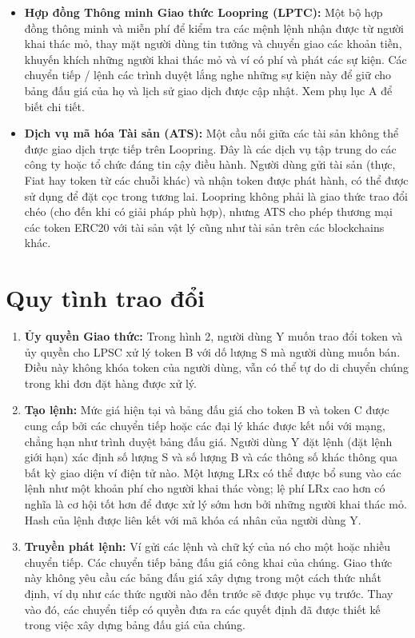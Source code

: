 \documentclass[12pt,a4paper]{article}
\begin{document}
\begin{multicols}{2}
\begin{itemize}
\item \textbf{Hợp đồng Thông minh Giao thức Loopring (LPTC): } Một bộ hợp đồng thông minh và miễn phí để kiểm tra các mệnh lệnh nhận được từ người khai thác mỏ, thay mặt người dùng tin tưởng và chuyển giao các khoản tiền, khuyến khích những người khai thác mỏ và ví có phí và phát các sự kiện. Các chuyển tiếp / lệnh các trình duyệt lắng nghe những sự kiện này để giữ cho bảng đấu giá của họ và lịch sử giao dịch được cập nhật. Xem phụ lục A để biết chi tiết.

\item \textbf{Dịch vụ mã hóa Tài sản (ATS):} Một cầu nối giữa các tài sản không thể được giao dịch trực tiếp trên Loopring. Đây là các dịch vụ tập trung do các công ty hoặc tổ chức đáng tin cậy điều hành. Người dùng gửi tài sản (thực, Fiat hay token từ các chuỗi khác) và nhận token được phát hành, có thể được sử dụng để đặt cọc trong tương lai. Loopring không phải là giao thức trao đổi chéo (cho đến khi có giải pháp phù hợp), nhưng ATS cho phép thương mại các token ERC20 với tài sản vật lý cũng như tài sản trên các blockchains khác.
\end{itemize}

\section{Quy tình trao đổi\label{sec:process}}

\begin{enumerate}[topsep=-5pt,itemsep=1ex,partopsep=5ex,parsep=1ex]
\item \textbf{Ủy quyền Giao thức: }Trong hình 2, người dùng Y muốn trao đổi token và ủy quyền cho LPSC xử lý token B với dố lượng S mà người dùng muốn bán. Điều này không khóa token của người dùng, vẫn có thể tự do di chuyển chúng trong khi đơn đặt hàng được xử lý.

\item \textbf{Tạo lệnh: }Mức giá hiện tại và bảng đấu giá cho token B và token C được cung cấp bởi các chuyển tiếp hoặc các đại lý khác được kết nối với mạng, chẳng hạn như trình duyệt bảng đấu giá. Người dùng Y đặt lệnh (đặt lệnh giới hạn) xác định số lượng S và số lượng B và các thông số khác thông qua bất kỳ giao diện ví điện tử nào. Một lượng LRx có thể được bổ sung vào các lệnh như một khoản phí cho người khai thác vòng; lệ phí LRx cao hơn có nghĩa là cơ hội tốt hơn để được xử lý sớm hơn bởi những người khai thác mỏ. Hash của lệnh được liên kết với mã khóa cá nhân của người dùng Y.

\item \textbf{Truyền phát lệnh: }Ví gửi các lệnh và chữ ký của nó cho một hoặc nhiều chuyển tiếp. Các chuyển tiếp bảng đấu giá công khai của chúng. Giao thức này không yêu cầu các bảng đấu giá xây dựng trong một cách thức nhất định, ví dụ như các thức người nào đến trước sẽ được phục vụ trước. Thay vào đó, các chuyển tiếp có quyền đưa ra các quyết định đã được thiết kế trong việc xây dựng bảng đấu giá của chúng.


\end{enumerate}
\end{multicols}
\end{document}
